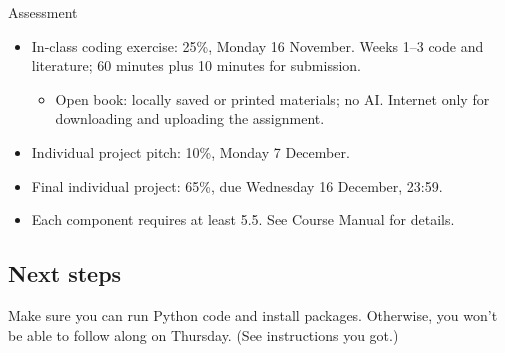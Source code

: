 \documentclass[compress]{beamer}
\begin{document}
\begin{frame}{Assessment}
\begin{itemize}
	\item In-class coding exercise: 25\%, Monday 16 November. Weeks 1--3 code and literature; 60 minutes plus 10 minutes for submission.
	\begin{itemize}
		\item Open book: locally saved or printed materials; no AI. Internet only for downloading and uploading the assignment.
	\end{itemize}
	\item Individual project pitch: 10\%, Monday 7 December.
	\item Final individual project: 65\%, due Wednesday 16 December, 23:59.
	\item Each component requires at least 5.5. See Course Manual for details.
\end{itemize}
\end{frame}


\subsection{Next steps}


\begin{frame}[standout]
	Make sure you can run Python code and install packages. Otherwise, you won't be able to follow along on Thursday. (See instructions you got.)
\end{frame}


\begin{frame}
	\printbibliography
\end{frame}
\end{document}

